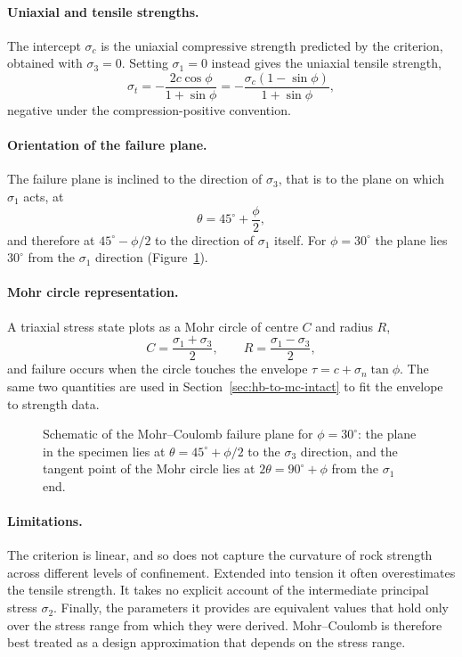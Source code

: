 \paragraph{Uniaxial and tensile strengths.}
The intercept \(\sigma_c\) is the uniaxial compressive strength predicted by
the criterion, obtained with \(\sigma_3 = 0\). Setting \(\sigma_1 = 0\)
instead gives the uniaxial tensile strength,
\[
\sigma_t =
-\frac{2c\cos\phi}{1+\sin\phi}
=
-\frac{\sigma_c(1-\sin\phi)}{1+\sin\phi} ,
\]
negative under the compression-positive convention.

\paragraph{Orientation of the failure plane.}
The failure plane is inclined to the direction of \(\sigma_3\), that is to the
plane on which \(\sigma_1\) acts, at
\[
\theta = 45^\circ + \frac{\phi}{2},
\]
and therefore at \(45^\circ - \phi/2\) to the direction of \(\sigma_1\)
itself. For \(\phi = 30^\circ\) the plane lies \(30^\circ\) from the
\(\sigma_1\) direction (Figure~\ref{fig:mohr-coulomb-plane}).

\paragraph{Mohr circle representation.}
A triaxial stress state plots as a Mohr circle of centre \(C\) and radius
\(R\),
\[
C = \frac{\sigma_1+\sigma_3}{2},
\qquad
R = \frac{\sigma_1-\sigma_3}{2} ,
\]
and failure occurs when the circle touches the envelope
\(\tau = c + \sigma_n \tan\phi\). The same two quantities are used in
Section~\ref{sec:hb-to-mc-intact} to fit the envelope to strength data.

\begin{figure}[htbp]
\centering
{}
\caption{Schematic of the Mohr--Coulomb failure plane for $\phi = 30^\circ$: the plane in the specimen lies at $\theta = 45^\circ + \phi/2$ to the $\sigma_3$ direction, and the tangent point of the Mohr circle lies at $2\theta = 90^\circ + \phi$ from the $\sigma_1$ end.}
\label{fig:mohr-coulomb-plane}
\end{figure}

\paragraph{Limitations.}
The criterion is linear, and so does not capture the curvature of rock
strength across different levels of confinement. Extended into tension it
often overestimates the tensile strength. It takes no explicit account of the
intermediate principal stress \(\sigma_2\). Finally, the parameters it provides are
equivalent values that hold only over the stress range from which they were
derived. Mohr--Coulomb is therefore best treated as a design approximation
that depends on the stress range.

